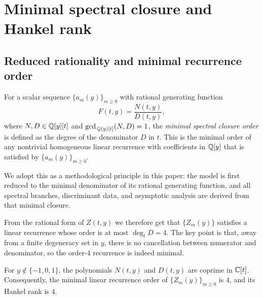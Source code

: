 \section{Minimal spectral closure and Hankel rank}\label{sec:hankel}

\subsection{Reduced rationality and minimal recurrence order}

\begin{definition}
\label{def:minimal-spectral-closure}
For a scalar sequence $\{a_m(y)\}_{m\ge 0}$ with rational generating function
\[
F(t,y)=\frac{N(t,y)}{D(t,y)},
\]
where $N,D\in\mathbb{Q}[y][t]$ and $\gcd_{\,\mathbb{Q}(y)[t]}(N,D)=1$,
the \emph{minimal spectral closure order} is defined as the degree of the denominator $D$ in $t$.
This is the minimal order of any nontrivial homogeneous linear recurrence with coefficients in $\mathbb{Q}[y]$
that is satisfied by $\{a_m(y)\}_{m\ge 0}$.
\end{definition}

We adopt this as a methodological principle in this paper:
the model is first reduced to the minimal denominator of its rational generating function,
and all spectral branches, discriminant data, and asymptotic analysis are derived from that minimal closure.

From the rational form of $Z(t,y)$ we therefore get that $\{Z_m(y)\}$ satisfies a linear recurrence whose order is at most $\deg_t D=4$.
The key point is that, away from a finite degeneracy set in $y$, there is no cancellation between numerator and denominator, so the order-$4$ recurrence is indeed minimal.

\begin{theorem}\label{thm:minimal-order}
For $y\notin\{-1,0,1\}$, the polynomials $N(t,y)$ and $D(t,y)$ are coprime in $\mathbb{C}[t]$.
Consequently, the minimal linear recurrence order of $\{Z_m(y)\}_{m\ge 0}$ is $4$, and its Hankel rank is $4$.
\end{theorem}

